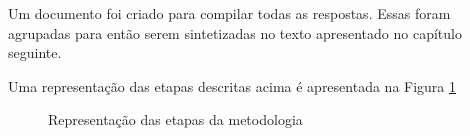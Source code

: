 Um documento foi criado para compilar todas as respostas. Essas foram agrupadas para então serem sintetizadas no texto apresentado no capítulo seguinte.

Uma representação das etapas descritas acima é apresentada na Figura \ref{fig:funil_metodologia}

\begin{figure}[!htb]
    \centering
    
    \caption{Representação das etapas da metodologia}
    \label{fig:funil_metodologia}
\end{figure}